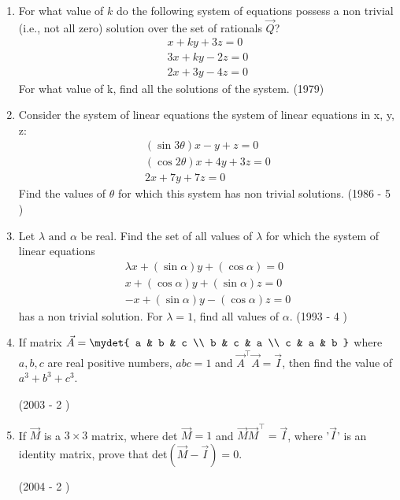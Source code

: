 \begin{enumerate}
\begin{enumerate}
	\end{enumerate}
\item For what value of $k$ do the following system of equations possess a non trivial (i.e., not all zero) solution over the set of rationals $\vec{Q}$?\begin{align*}
x+ky+3z=0\\3x+ky-2z=0\\2x+3y-4z=0\end{align*} For what value of k, find all the solutions of the system. \hfill (1979)\\[2pt]
\item Consider the system of linear equations the system of linear equations in x, y, z:\begin{align*}(\sin 3\theta) x-y+z=0\\(\cos 2\theta)x+4y+3z=0\\2x+7y+7z=0\end{align*} Find the values of $\theta$ for which this system has non trivial solutions. \hfill (1986 - 5 )\\[2pt]
\item Let $\lambda\text{ and }\alpha$ be real. Find the set of all values of $\lambda$ for which the system of linear equations \begin{align*}\lambda x+(\sin\alpha)y+(\cos\alpha)=0\\ x+(\cos\alpha)y+(\sin\alpha)z=0\\-x+(\sin\alpha)y-(\cos\alpha)z=0\end{align*} has a non trivial solution. For $\lambda = 1$, find all values of $\alpha$. \hfill (1993 - 4 )\\[2pt]
	\item If matrix 
		$\vec{A} = \mydet{
			a & b & c \\
			b & c & a \\
			c & a & b } $
		where $a,b,c$ are real positive numbers, $abc=1$ and $\vec{A}^\top\vec{A}=\vec{I}$, then find the value of $a^3+b^3+c^3$.

		\hfill(2003 - 2 )

	\item If $\vec{M}$ is a $3\times3$ matrix, where det $\vec{M}=1$ and $\vec{M}\vec{M}^\top=\vec{I}$, where '$\vec{I}$' is an identity matrix, prove that det$(\vec{M}-\vec{I})=0$.
		
		\hfill(2004 - 2 )


\end{enumerate}
